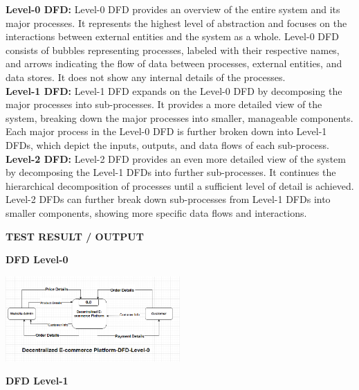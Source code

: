 \documentclass[a4paper,11pt]{article}
\begin{document}
\begin{center}
    \textbf{ Level-0 DFD:} Level-0 DFD provides an overview of the entire system and its major processes. It represents the highest level of abstraction and focuses on the interactions between external entities and the system as a whole. Level-0 DFD consists of bubbles representing processes, labeled with their respective names, and arrows indicating the flow of data between processes, external entities, and data stores. It does not show any internal details of the processes.  \\
   \textbf{Level-1 DFD:}
Level-1 DFD expands on the Level-0 DFD by decomposing the major processes into sub-processes. It provides a more detailed view of the system, breaking down the major processes into smaller, manageable components. Each major process in the Level-0 DFD is further broken down into Level-1 DFDs, which depict the inputs, outputs, and data flows of each sub-process.    \\ 
    \textbf{Level-2 DFD:}
Level-2 DFD provides an even more detailed view of the system by decomposing the Level-1 DFDs into further sub-processes. It continues the hierarchical decomposition of processes until a sufficient level of detail is achieved. Level-2 DFDs can further break down sub-processes from Level-1 DFDs into smaller components, showing more specific data flows and interactions.
    





\newpage



\vspace{0.5cm}


\vspace{1cm}

\begin{center}
    \textbf{\Large TEST RESULT / OUTPUT }
    \vspace{0.5cm}

\textbf{DFD Level-0} 

\vspace{0.5cm}

\includegraphics[width=0.5\textwidth]{DFD-Level-0.png} 

\textbf{DFD Level-1}


\end{center}
\end{center}
\end{document}
